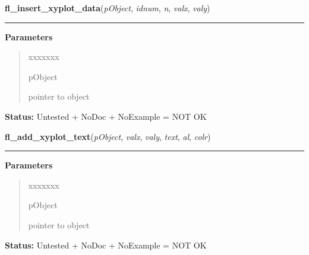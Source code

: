 \hspace{.8\funcindent}\begin{boxedminipage}{\funcwidth}

    \raggedright \textbf{fl\_insert\_xyplot\_data}(\textit{pObject}, \textit{idnum}, \textit{n}, \textit{valx}, \textit{valy})

    \vspace{-1.5ex}

    \rule{\textwidth}{0.5\fboxrule}
\setlength{\parskip}{2ex}
\setlength{\parskip}{1ex}
      \textbf{Parameters}
      \vspace{-1ex}

      \begin{quote}
        \begin{Ventry}{xxxxxxx}

          \item[pObject]

          pointer to object

        \end{Ventry}

      \end{quote}

\textbf{Status:} Untested + NoDoc + NoExample = NOT OK



    \end{boxedminipage}

    \label{xformslib:library:fl_add_xyplot_text}

    \vspace{0.5ex}

\hspace{.8\funcindent}\begin{boxedminipage}{\funcwidth}

    \raggedright \textbf{fl\_add\_xyplot\_text}(\textit{pObject}, \textit{valx}, \textit{valy}, \textit{text}, \textit{al}, \textit{colr})

    \vspace{-1.5ex}

    \rule{\textwidth}{0.5\fboxrule}
\setlength{\parskip}{2ex}
\setlength{\parskip}{1ex}
      \textbf{Parameters}
      \vspace{-1ex}

      \begin{quote}
        \begin{Ventry}{xxxxxxx}

          \item[pObject]

          pointer to object

        \end{Ventry}

      \end{quote}

\textbf{Status:} Untested + NoDoc + NoExample = NOT OK



    \end{boxedminipage}


